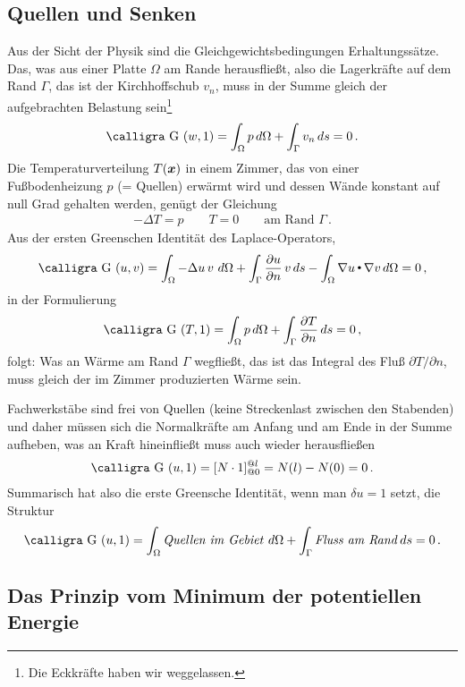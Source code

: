 {{{{{%
{\textcolor{sectionTitleBlue}{\section{Quellen und Senken}}}
Aus der Sicht der Physik sind die Gleichgewichtsbedingungen Erhaltungss\"{a}tze. Das, was aus einer Platte $\Omega$ am Rande herausflie{\ss}t, also die Lagerkr\"{a}fte auf dem Rand $\Gamma$, das ist der Kirchhoffschub $v_n$, muss in der Summe gleich der aufgebrachten Belastung sein\footnote{Die Eckkr\"{a}fte haben wir weggelassen.}
\begin{align}
\text{\normalfont\calligra G\,\,}(w,1) = \int_{\Omega} p \,d\Omega + \int_{\Gamma} v_n\,ds = 0\,.
\end{align}
Die Temperaturverteilung $T(\mbox{\boldmath $x$})$ in einem Zimmer, das von einer Fu{\ss}bodenheizung $p$ (= Quellen) erw\"{a}rmt wird und dessen W\"{a}nde konstant auf null Grad gehalten werden, gen\"{u}gt der Gleichung
\begin{align}
- \Delta T = p \qquad T = 0 \qquad \text{am Rand $\Gamma$}\,.
\end{align}
Aus der ersten Greenschen Identit\"{a}t des Laplace-Operators,
\begin{align}\label{Eq90}
\text{\normalfont\calligra G\,\,}(u, v) = \int_{\Omega} - \Delta u\,v\,\,d\Omega + \int_{\Gamma} \frac{\partial u}{\partial n}\,v\,ds - \int_{\Omega} \nabla u \dotprod \nabla v\,d\Omega = 0\,,
\end{align}
in der Formulierung
\begin{align}
\text{\normalfont\calligra G\,\,}(T,1) = \int_{\Omega} p \,d\Omega + \int_{\Gamma} \frac{\partial T}{\partial n}\,ds = 0\,,
\end{align}
folgt: Was an W\"{a}rme am Rand $\Gamma$ wegflie{\ss}t, das ist das Integral des Flu{\ss} $\partial T/\partial n$, muss gleich der im Zimmer produzierten W\"{a}rme sein.

Fachwerkst\"{a}be sind frei von Quellen (keine Streckenlast zwischen den Stabenden) und daher m\"{u}ssen sich die Normalkr\"{a}fte am Anfang und am Ende in der Summe aufheben, was an Kraft hineinflie{\ss}t muss auch wieder herausflie{\ss}en
\begin{align}
\text{\normalfont\calligra G\,\,}(u,1) = [N\cdot 1]_{@0}^{@l} = N(l) - N(0) = 0\,.
\end{align}
Summarisch hat also die erste Greensche Identit\"{a}t, wenn man $\delta u = 1$ setzt, die Struktur
\begin{align}
\text{\normalfont\calligra G\,\,}(u,1) = \int_{\Omega} \text{{\em Quellen im Gebiet\/}}\,\,d\Omega + \int_{\Gamma} \text{{\em Fluss am Rand\/}}\,ds = 0\,.
\end{align}
{\textcolor{sectionTitleBlue}{\section{Das Prinzip vom Minimum der potentiellen Energie}}}

}}}}}

